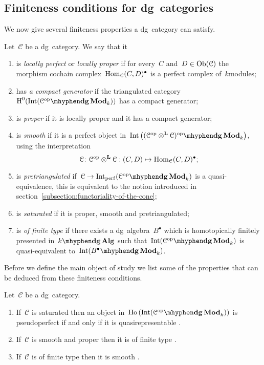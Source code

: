 \begin{refsection}
\subsection{Finiteness conditions for dg~categories}
We now give several finiteness properties a dg~category can satisfy.
\begin{definition}
  Let~$\mathcal{C}$ be a dg~category. We say that it
  \begin{enumerate}
    \item is \emph{locally perfect} or \emph{locally proper} if for every~$C$ and~$D\in\operatorname{Ob}(\mathcal{C})$ the morphism cochain complex~$\mathrm{Hom}_{\mathcal{C}}(C,D)^\bullet$ is a perfect complex of~$k$\dash modules;
    \item has \emph{a compact generator} if the triangulated category~$\HH^0(\Int(\dgMod{\mathcal{C}^\opp}_k))$ has a compact generator;
    \item is \emph{proper} if it is locally proper and it has a compact generator;
    \item is \emph{smooth} if it is a perfect object in~$\Int\left( \dgMod{(\mathcal{C}^\opp\otimes^{\mathbf{L}}\mathcal{C})^\opp}_k \right)$, using the interpretation
      \begin{equation}
        \mathcal{C}\colon\mathcal{C}^{\mathrm{op}}\otimes^{\mathbf{L}}\mathcal{C}:(C,D)\mapsto\mathrm{Hom}_{\mathcal{C}}(C,D)^\bullet;
      \end{equation}
    \item is \emph{pretriangulated} if~$\mathcal{C}\to\Int_\perf(\dgMod{\mathcal{C}^\opp}_k)$ is a quasi-equivalence, this is equivalent to the notion introduced in section~\ref{subsection:functoriality-of-the-cone};
    \item is \emph{saturated} if it is proper, smooth and pretriangulated;
    \item is \emph{of finite type} if there exists a dg~algebra~$B^\bullet$ which is homotopically finitely presented in~$\dgAlg$ such that~$\Int(\dgMod{\mathcal{C}^\opp}_k)$ is quasi-equivalent to~$\Int(\dgMod{B^\bullet}_k)$.
  \end{enumerate}
\end{definition}
Before we define the main object of study we list some of the properties that can be deduced from these finiteness conditions.
\begin{proposition}
  \label{proposition:dg-properties}
  Let~$\mathcal{C}$ be a dg~category.
  \begin{enumerate}
    \item If~$\mathcal{C}$ is saturated then an object in~$\Ho(\Int(\dgMod{\mathcal{C}^\opp}_k))$ is pseudoperfect if and only if it is quasirepresentable \cite[corollary 2.9(2)]{toen-vaquie}.
    \item If~$\mathcal{C}$ is smooth and proper then it is of finite type \cite[corollary 2.13]{toen-vaquie}.
    \item If~$\mathcal{C}$ is of finite type then it is smooth \cite[corollary 2.14]{toen-vaquie}.
  \end{enumerate}
\end{proposition}


\end{refsection}

